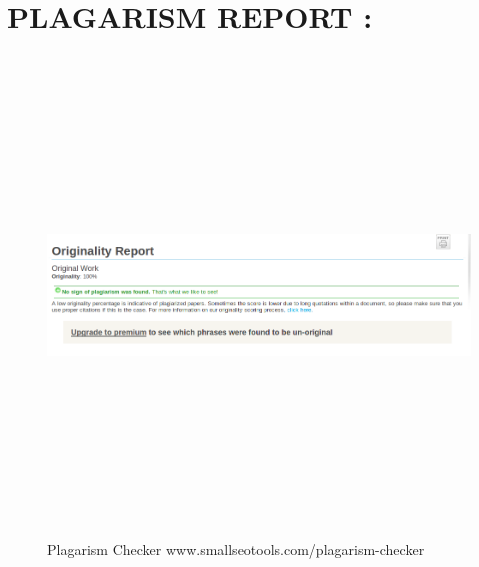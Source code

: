 \documentclass[11pt]{article}
\begin{document}
	\section{PLAGARISM REPORT :}
	\begin{figure}[h!]
		\centering
		\includegraphics[height=5in,width=6in]{plagiarism5.png}
		\caption{Plagarism Checker www.smallseotools.com/plagarism-checker}
	\end{figure}
	\newpage
\end{document}

